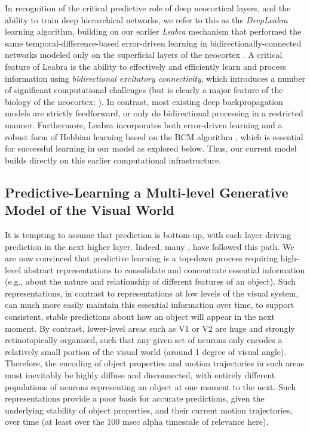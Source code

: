 \documentclass[11pt,twoside]{article}
\newif\myifpdf
\begin{document}
In recognition of the critical predictive role of deep neocortical layers, and the ability to train deep hierarchical networks, we refer to this as the {\em DeepLeabra} learning algorithm, building on our earlier {\em Leabra} mechanism that performed the same temporal-difference-based error-driven learning in bidirectionally-connected networks modeled only on the superficial layers of the neocortex \cite{OReillyHazyHerd15,OReillyMunakataFrankEtAl12,OReillyMunakata00,OReilly96}.
A critical feature of Leabra is the ability to effectively and efficiently learn and process information using {\em bidirectional excitatory connectivity}, which introduces a number of significant computational challenges (but is clearly a major feature of the biology of the neocortex; ). In contrast, most existing deep backpropagation models are strictly feedforward, or only do bidirectional processing in a restricted manner.  Furthermore, Leabra incorporates both error-driven learning and a robust form of Hebbian learning based on the BCM algorithm \cite{BienenstockCooperMunro82,CooperIntratorBlaisEtAl04,ShouvalWangWittenberg10}, which is essential for successful learning in our model as explored below.  Thus, our current model builds directly on this earlier computational infrastructure.


\subsection{Predictive-Learning a Multi-level Generative Model of the Visual World}
It is tempting to assume that prediction is bottom-up, with each layer driving prediction in the next higher layer. Indeed, many \cite{ShragerJohnson96,BengioYaoAlainEtAl13,Valpola14,RasmusBerglundHonkalaEtAl15,HintonSalakhutdinov06}, have followed this path. We are now convinced that predictive learning is a top-down process requiring high-level abstract representations to consolidate and concentrate essential information (e.g., about the nature and relationship of different features of an object).  Such representations, in contrast to representations at low levels of the visual system, can much more easily maintain this essential information over time, to support consistent, stable predictions about how an object will appear in the next moment.  By contrast, lower-level areas such as V1 or V2 are huge and strongly retinotopically organized, such that any given set of neurons only encodes a relatively small portion of the visual world (around 1 degree of visual angle).  Therefore, the encoding of object properties and motion trajectories in such areas must inevitably be highly diffuse and disconnected, with entirely different populations of neurons representing an object at one moment to the next.  Such representations provide a poor basis for accurate predictions, given the underlying stability of object properties, and their current motion trajectories, over time (at least over the 100 msec alpha timescale of relevance here).
\end{document}
